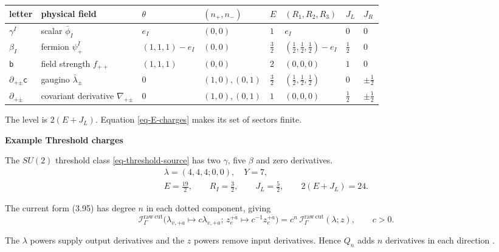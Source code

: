 \documentclass[11pt]{article}
\numberwithin{equation}{section}
\numberwithin{figure}{section}
\numberwithin{table}{section}
\begin{document}
{\small\renewcommand{\arraystretch}{1.25}\setlength{\tabcolsep}{4pt}
\begin{xltabular}{\linewidth}{@{}l>{\raggedright\arraybackslash}Xllllll@{}}
\toprule
letter & physical field & $\theta$ & $(n_+,n_-)$ & $E$ & $(R_1,R_2,R_3)$ & $J_L$ & $J_R$\\
\midrule\endhead
$\gamma^I$ & scalar $\bar\phi_I$ & $e_I$ & $(0,0)$ & $1$ & $e_I$ & $0$ & $0$\\
$\beta_I$ & fermion $\psi^I_+$ & $(1,1,1)-e_I$ & $(0,0)$ & $\tfrac32$ & $(\tfrac12,\tfrac12,\tfrac12)-e_I$ & $\tfrac12$ & $0$\\
$\mathsf b$ & field strength $f_{++}$ & $(1,1,1)$ & $(0,0)$ & $2$ & $(0,0,0)$ & $1$ & $0$\\
$\partial_{+\dot\pm}\mathsf c$ & gaugino $\bar\lambda_{\dot\pm}$ & $0$ & $(1,0),(0,1)$ & $\tfrac32$ & $(\tfrac12,\tfrac12,\tfrac12)$ & $0$ & $\pm\tfrac12$\\
$\partial_{+\dot\pm}$ & covariant derivative $\nabla_{+\dot\pm}$ & $0$ & $(1,0),(0,1)$ & $1$ & $(0,0,0)$ & $\tfrac12$ & $\pm\tfrac12$\\
\bottomrule
\end{xltabular}}

The level is $2(E+J_L)$. Equation \eqref{eq-E-charges} makes its set of sectors finite.

\begin{proofbox}
\textbf{Example Threshold charges}

The $SU(2)$ threshold class \eqref{eq-threshold-source} has two $\gamma$, five $\beta$ and zero derivatives.
\begin{equation*}
\begin{gathered}\lambda=(4,4,4;0,0),\quad Y=7,\\E=\frac{19}{2},\qquad R_I=\frac32,\qquad J_L=\frac52,\qquad 2(E+J_L)=24.\end{gathered}
\end{equation*}
\end{proofbox}

The current form (3.95) has degree $n$ in each dotted component, giving
\begin{equation}\label{eq-derivative-homogeneity}
\mathcal I_\Gamma^{\mathrm{raw\ cut}}
\bigl(\lambda_{v,+\dot a}\mapsto c\lambda_{v,+\dot a};\,
z_e^{+\dot a}\mapsto c^{-1}z_e^{+\dot a}\bigr)
=c^n\,\mathcal I_\Gamma^{\mathrm{raw\ cut}}(\lambda;z),
\qquad c>0.
\end{equation}

The $\lambda$ powers supply output derivatives and the $z$ powers remove input derivatives. Hence $Q_n$ adds $n$ derivatives in each direction \cite[Equations (3.44)--(3.45)]{semichiral}.
\end{document}
